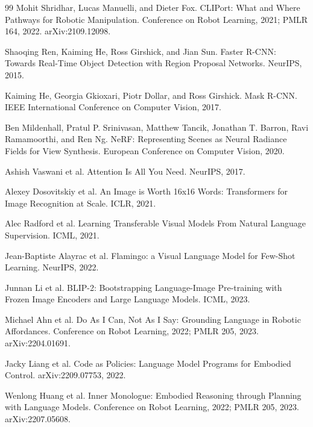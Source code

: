 \documentclass[11pt,oneside,openany]{oblivoir}
\numberwithin{section}{chapter}
\numberwithin{subsection}{section}
\numberwithin{equation}{chapter}
\begin{document}
\begin{thebibliography}{99}
Mohit Shridhar, Lucas Manuelli, and Dieter Fox.
\newblock CLIPort: What and Where Pathways for Robotic Manipulation.
\newblock Conference on Robot Learning, 2021; PMLR 164, 2022. arXiv:2109.12098.

Shaoqing Ren, Kaiming He, Ross Girshick, and Jian Sun.
\newblock Faster R-CNN: Towards Real-Time Object Detection with Region Proposal Networks.
\newblock NeurIPS, 2015.

Kaiming He, Georgia Gkioxari, Piotr Dollar, and Ross Girshick.
\newblock Mask R-CNN.
\newblock IEEE International Conference on Computer Vision, 2017.

Ben Mildenhall, Pratul P. Srinivasan, Matthew Tancik, Jonathan T. Barron, Ravi Ramamoorthi, and Ren Ng.
\newblock NeRF: Representing Scenes as Neural Radiance Fields for View Synthesis.
\newblock European Conference on Computer Vision, 2020.

Ashish Vaswani et al.
\newblock Attention Is All You Need.
\newblock NeurIPS, 2017.

Alexey Dosovitskiy et al.
\newblock An Image is Worth 16x16 Words: Transformers for Image Recognition at Scale.
\newblock ICLR, 2021.

Alec Radford et al.
\newblock Learning Transferable Visual Models From Natural Language Supervision.
\newblock ICML, 2021.

Jean-Baptiste Alayrac et al.
\newblock Flamingo: a Visual Language Model for Few-Shot Learning.
\newblock NeurIPS, 2022.

Junnan Li et al.
\newblock BLIP-2: Bootstrapping Language-Image Pre-training with Frozen Image Encoders and Large Language Models.
\newblock ICML, 2023.

Michael Ahn et al.
\newblock Do As I Can, Not As I Say: Grounding Language in Robotic Affordances.
\newblock Conference on Robot Learning, 2022; PMLR 205, 2023. arXiv:2204.01691.

Jacky Liang et al.
\newblock Code as Policies: Language Model Programs for Embodied Control.
\newblock arXiv:2209.07753, 2022.

Wenlong Huang et al.
\newblock Inner Monologue: Embodied Reasoning through Planning with Language Models.
\newblock Conference on Robot Learning, 2022; PMLR 205, 2023. arXiv:2207.05608.


\end{thebibliography}
\end{document}
